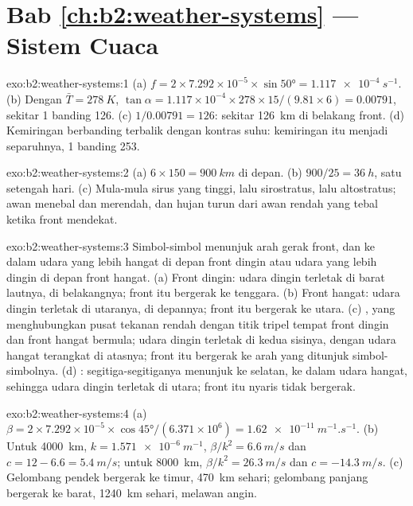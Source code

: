 \section*{Bab \ref{ch:b2:weather-systems} --- Sistem Cuaca}

\begin{solution}{exo:b2:weather-systems:1}
(a) $f = 2 \times 7.292 \times 10^{-5} \times \sin\ang{50} = \qty{1.117e-4}{s^{-1}}$. (b) Dengan
$\bar T = \qty{278}{K}$, $\tan\alpha = 1.117 \times 10^{-4} \times 278 \times 15/(9.81 \times 6)
= 0.00791$, sekitar 1 banding 126. (c) $1/0.00791 = 126$: sekitar \qty{126}{km} di belakang front. (d)
Kemiringan berbanding terbalik dengan kontras suhu: kemiringan itu menjadi separuhnya, 1 banding 253.
\end{solution}

\begin{solution}{exo:b2:weather-systems:2}
(a) $6 \times 150 = \qty{900}{km}$ di depan. (b) $900/25 = \qty{36}{h}$, satu setengah hari. (c) Mula-mula
sirus yang tinggi, lalu sirostratus, lalu altostratus; awan menebal dan merendah, dan hujan
turun dari awan rendah yang tebal ketika front mendekat.
\end{solution}

\begin{solution}{exo:b2:weather-systems:3}
Simbol-simbol menunjuk arah gerak front, dan ke dalam udara yang lebih hangat di depan front dingin atau
udara yang lebih dingin di depan front hangat. (a) Front dingin: udara dingin terletak di barat lautnya, di belakangnya;
front itu bergerak ke tenggara. (b) Front hangat: udara dingin terletak di utaranya, di depannya; front itu bergerak ke
utara. (c) , yang menghubungkan pusat tekanan rendah dengan titik tripel tempat front dingin dan front hangat
bermula; udara dingin terletak di kedua sisinya, dengan udara hangat terangkat di atasnya; front itu bergerak ke arah yang ditunjuk
simbol-simbolnya. (d) : segitiga-segitiganya menunjuk ke selatan, ke dalam udara hangat, sehingga udara dingin
terletak di utara; front itu nyaris tidak bergerak.
\end{solution}

\begin{solution}{exo:b2:weather-systems:4}
(a) $\beta = 2 \times 7.292 \times 10^{-5} \times \cos\ang{45}/(6.371 \times 10^6) =
\qty{1.62e-11}{m^{-1}.s^{-1}}$. (b) Untuk \qty{4000}{km}, $k = \qty{1.571e-6}{m^{-1}}$, $\beta/k^2 =
\qty{6.6}{m/s}$ dan $c = 12 - 6.6 = \qty{5.4}{m/s}$; untuk \qty{8000}{km}, $\beta/k^2 =
\qty{26.3}{m/s}$ dan $c = \qty{-14.3}{m/s}$. (c) Gelombang pendek bergerak ke timur, \qty{470}{km} sehari;
gelombang panjang bergerak ke barat, \qty{1240}{km} sehari, melawan angin.
\end{solution}

